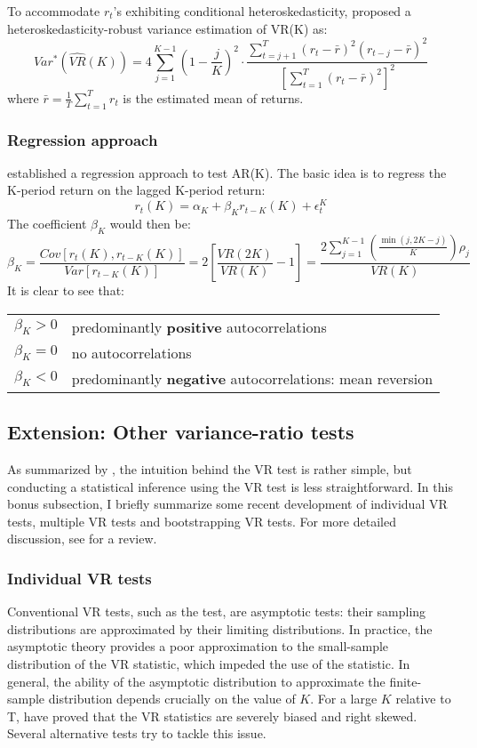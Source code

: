 To accommodate $r_t$'s exhibiting conditional heteroskedasticity, \citet{lo1988stock} proposed a heteroskedasticity-robust
variance estimation of VR(K) as:
$$
Var^*(\hat{VR}(K)) = 4\sum^{K-1}_{j=1}\left(1-\frac{j}{K}\right)^2 \cdot \frac{\sum^T_{t=j+1}(r_t-\bar{r})^2(r_{t-j}-\bar{r})^2}{\left[\sum^T_{t=1}(r_t-\bar{r})^2\right]^2}
$$
where $\bar{r}=\frac{1}{T}\sum^{T}_{t=1}r_t$ is the estimated mean of returns.

\subsubsection{Regression approach}
\citet{fama1988permanent} established a regression approach to test AR(K). The basic idea is to regress the
K-period return on the lagged K-period return:
$$
    r_t(K) = \alpha_K + \beta_K r_{t-K}(K)+\epsilon_t^K
$$
The coefficient $\beta_K$ would then be:
\begin{equation}
    \beta_K = \frac{Cov[r_t(K),r_{t-K}(K)]}{Var[r_{t-K}(K)]} = 2\left[\frac{VR(2K)}{VR(K)}-1\right]=\frac{2\sum^{K-1}_{j=1}\left(\frac{\min (j,2K-j)}{K}\right)\rho_j}{VR(K)}
\end{equation}
It is clear to see that:
\begin{center}
    \begin{tabular}{rl}
    \hline
    $\beta_K > 0$ & predominantly \textbf{positive} autocorrelations  \\ 
    $\beta_K = 0$ & no autocorrelations \\ 
    $\beta_K < 0$ & predominantly \textbf{negative} autocorrelations: mean reversion \\
    \hline
    \end{tabular}
\end{center}

\subsection{Extension: Other variance-ratio tests}\label{chap1:sec1:ssec3}
As summarized by \citet{charles2009variance}, the intuition behind the VR test is rather simple, but conducting a statistical inference using the VR test is less
straightforward. In this bonus subsection, I briefly summarize some recent development of individual VR tests, multiple VR tests and bootstrapping VR tests.
For more detailed discussion, see \citet{charles2009variance} for a review.

\subsubsection{Individual VR tests}
Conventional VR tests, such as the \citeauthor{lo1988stock} test, are asymptotic tests: their sampling distributions are approximated by their limiting distributions.
In practice, the asymptotic theory provides a poor approximation to the small-sample distribution of the VR statistic, which impeded the use of the statistic.
In general, the ability of the asymptotic distribution to approximate the finite-sample distribution depends crucially on the value of $K$. For a large $K$ relative to T,
\citet{lo1990contrarian} have proved that the VR statistics are severely biased and right skewed. Several alternative tests try to tackle this issue.

